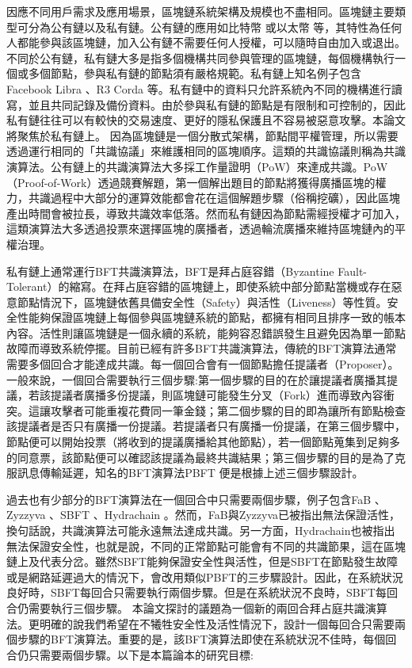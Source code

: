 因應不同用戶需求及應用場景，區塊鏈系統架構及規模也不盡相同。區塊鏈主要類型可分為公有鏈以及私有鏈。公有鏈的應用如比特幣 \cite{Bitcoin}或以太幣 \cite{Ethereum}等，其特性為任何人都能參與該區塊鏈，加入公有鏈不需要任何人授權，可以隨時自由加入或退出。不同於公有鏈，私有鏈大多是指多個機構共同參與管理的區塊鏈，每個機構執行一個或多個節點，參與私有鏈的節點須有嚴格規範。私有鏈上知名例子包含Facebook Libra \cite{STEVE_HANNA2010}、R3 Corda \cite{R3}等。私有鏈中的資料只允許系統內不同的機構進行讀寫，並且共同記錄及備份資料。由於參與私有鏈的節點是有限制和可控制的，因此私有鏈往往可以有較快的交易速度、更好的隱私保護且不容易被惡意攻擊。本論文將聚焦於私有鏈上。
因為區塊鏈是一個分散式架構，節點間平權管理，所以需要透過運行相同的「共識協議」來維護相同的區塊順序。這類的共識協議則稱為共識演算法。公有鏈上的共識演算法大多採工作量證明（PoW）來達成共識。PoW（Proof-of-Work）透過競賽解題，第一個解出題目的節點將獲得廣播區塊的權力，共識過程中大部分的運算效能都會花在這個解題步驟（俗稱挖礦），因此區塊產出時間會被拉長，導致共識效率低落。然而私有鏈因為節點需經授權才可加入，這類演算法大多透過投票來選擇區塊的廣播者，透過輪流廣播來維持區塊鏈內的平權治理。

私有鏈上通常運行BFT共識演算法，BFT是拜占庭容錯（Byzantine Fault-Tolerant）的縮寫。在拜占庭容錯的區塊鏈上，即使系統中部分節點當機或存在惡意節點情況下，區塊鏈依舊具備安全性（Safety）與活性（Liveness）等性質。安全性能夠保證區塊鏈上每個參與區塊鏈系統的節點，都擁有相同且排序一致的帳本內容。活性則讓區塊鏈是一個永續的系統，能夠容忍錯誤發生且避免因為單一節點故障而導致系統停擺。目前已經有許多BFT共識演算法，傳統的BFT演算法通常需要多個回合才能達成共識。每一個回合會有一個節點擔任提議者（Proposer）。一般來說，一個回合需要執行三個步驟:第一個步驟的目的在於讓提議者廣播其提議，若該提議者廣播多份提議，則區塊鏈可能發生分叉（Fork）進而導致內容衝突。這讓攻擊者可能重複花費同一筆金錢；第二個步驟的目的即為讓所有節點檢查該提議者是否只有廣播一份提議。若提議者只有廣播一份提議，在第三個步驟中，節點便可以開始投票（將收到的提議廣播給其他節點），若一個節點蒐集到足夠多的同意票，該節點便可以確認該提議為最終共識結果；第三個步驟的目的是為了克服訊息傳輸延遲，知名的BFT演算法PBFT \cite{castro1999practical}便是根據上述三個步驟設計。

過去也有少部分的BFT演算法在一個回合中只需要兩個步驟，例子包含FaB \cite{abraham2018revisiting}、Zyzzyva \cite{kotla2007zyzzyva}、SBFT \cite{martin2006fast}、Hydrachain \cite{Hydrachain}。然而，FaB與Zyzzyva已被指出無法保證活性，換句話說，共識演算法可能永遠無法達成共識。另一方面，Hydrachain也被指出無法保證安全性，也就是說，不同的正常節點可能會有不同的共識節果，這在區塊鏈上及代表分岔。雖然SBFT能夠保證安全性與活性，但是SBFT在節點發生故障或是網路延遲過大的情況下，會改用類似PBFT的三步驟設計。因此，在系統狀況良好時，SBFT每回合只需要執行兩個步驟。但是在系統狀況不良時，SBFT每回合仍需要執行三個步驟。
本論文探討的議題為一個新的兩回合拜占庭共識演算法。更明確的說我們希望在不犧牲安全性及活性情況下，設計一個每回合只需要兩個步驟的BFT演算法。重要的是，該BFT演算法即使在系統狀況不佳時，每個回合仍只需要兩個步驟。以下是本篇論本的研究目標: 

